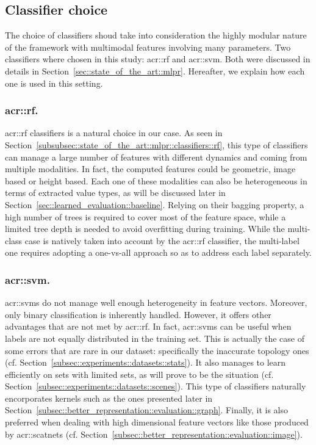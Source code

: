     \subsection{Classifier choice}
        \label{subsec::learned_evaluation::classification::classifiers}
        The choice of classifiers shoud take into consideration the highly modular nature of the framework with multimodal features involving many parameters.
        Two classifiers where chosen in this study: \gls{acr::rf} and \gls{acr::svm}.
        Both were discussed in details in Section~\ref{sec::state_of_the_art::mlpr}.
        Hereafter, we explain how each one is used in this setting.

        \subsubsection{\acrlong*{acr::rf}.}
            \gls{acr::rf} classifiers is a natural choice in our case.
            As seen in Section~\ref{subsubsec::state_of_the_art::mlpr::classifiers::rf}, this type of classifiers can manage a large number of features with different dynamics and coming from multiple modalities.
            In fact, the computed features could be geometric, image based or height based.
            Each one of these modalities can also be heterogeneous in terms of extracted value types, as will be discussed later in Section~\ref{sec::learned_evaluation::baseline}.
            Relying on their bagging property, a high number of trees is required to cover most of the feature space, while a limited tree depth is needed to avoid overfitting during training.
            While the multi-class case is natively taken into account by the \gls{acr::rf} classifier, the multi-label one requires adopting a one-vs-all approach so as to address each label separately.

        \subsubsection{\acrshort*{acr::svm}.}
            \glspl{acr::svm} do not manage well enough heterogeneity in feature vectors.
            Moreover, only binary classification is inherently handled.
            However, it offers other advantages that are not met by \gls{acr::rf}.
            In fact, \glspl{acr::svm} can be useful when labels are not equally distributed in the training set.
            This is actually the case of some errors that are rare in our dataset: specifically the inaccurate topology ones (cf. Section~\ref{subsec::experiments::datasets::stats}).
            It also manages to learn efficiently on sets with limited sets, as will prove to be the situation (cf. Section~\ref{subsec::experiments::datasets::scenes}). 
            This type of classifiers naturally encorporates kernels such as the ones presented later in Section~\ref{subsec::better_representation::evaluation::graph}.
            Finally, it is also preferred when dealing with high dimensional feature vectors like those produced by \glspl{acr::scatnet} (cf. Section~\ref{subsec::better_representation::evaluation::image}).

